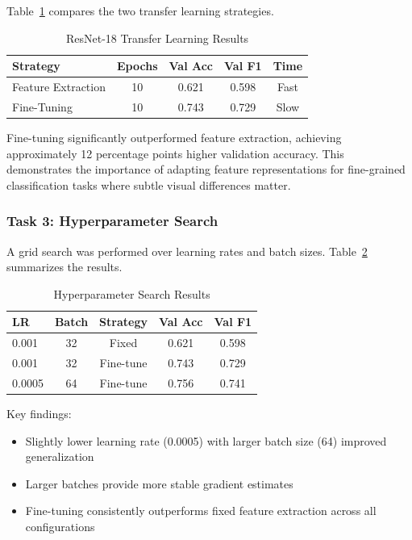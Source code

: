 \documentclass[conference]{IEEEtran}
\begin{document}
Table~\ref{tab:lab2_resnet_compare} compares the two transfer learning strategies.

\begin{table}[H]
\centering
\caption{ResNet-18 Transfer Learning Results}
\label{tab:lab2_resnet_compare}
\begin{tabular}{@{}lcccc@{}}
\toprule
\textbf{Strategy} & \textbf{Epochs} & \textbf{Val Acc} & \textbf{Val F1} & \textbf{Time} \\ \midrule
Feature Extraction & 10 & 0.621 & 0.598 & Fast \\
Fine-Tuning & 10 & 0.743 & 0.729 & Slow \\ \bottomrule
\end{tabular}
\end{table}

Fine-tuning significantly outperformed feature extraction, achieving approximately 12 percentage points higher validation accuracy. This demonstrates the importance of adapting feature representations for fine-grained classification tasks where subtle visual differences matter.

\subsubsection{Task 3: Hyperparameter Search}

A grid search was performed over learning rates and batch sizes. Table~\ref{tab:lab2_hyperparam} summarizes the results.

\begin{table}[H]
\centering
\caption{Hyperparameter Search Results}
\label{tab:lab2_hyperparam}
\begin{tabular}{@{}lcccc@{}}
\toprule
\textbf{LR} & \textbf{Batch} & \textbf{Strategy} & \textbf{Val Acc} & \textbf{Val F1} \\ \midrule
0.001 & 32 & Fixed & 0.621 & 0.598 \\
0.001 & 32 & Fine-tune & 0.743 & 0.729 \\
0.0005 & 64 & Fine-tune & 0.756 & 0.741 \\ \bottomrule
\end{tabular}
\end{table}

Key findings:
\begin{itemize}
\item Slightly lower learning rate (0.0005) with larger batch size (64) improved generalization
\item Larger batches provide more stable gradient estimates
\item Fine-tuning consistently outperforms fixed feature extraction across all configurations
\end{itemize}
\end{document}
